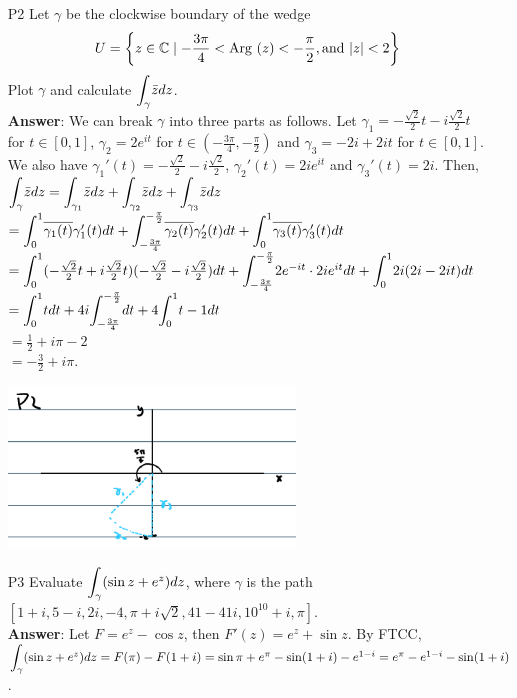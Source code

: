\documentclass{article}
\begin{document}
\begin{itemize}
    \item [P2] Let $\gamma$ be the clockwise boundary of the wedge \[U=\left\{z\in\mathbb{C}\mid-\frac{3\pi}{4}<\text{Arg }(z)<-\frac{\pi}{2},\text{and }\abs{z}<2\right\}\] Plot $\gamma$ and calculate $\mathlarger{\int_\gamma}\bar{z}dz$.\\
          \textbf{Answer}: We can break $\gamma$ into three parts as follows. Let $\gamma_1=-\frac{\sqrt{2}}{2}t-i\frac{\sqrt{2}}{2}t$ for $t\in[0,1]$, $\gamma_2=2e^{it}$ for $t\in(-\frac{3\pi}{4},-\frac{\pi}{2})$ and $\gamma_3=-2i+2it$ for $t\in[0,1]$. We also have $\gamma_1'(t)=-\frac{\sqrt{2}}{2}-i\frac{\sqrt{2}}{2}$, $\gamma_2'(t)=2ie^{it}$ and $\gamma_3'(t)=2i$. Then,\\
          $\mathlarger{\int_\gamma}\bar{z}dz=\mathlarger{\int_{\gamma_1}}\bar{z}dz+\mathlarger{\int_{\gamma_2}}\bar{z}dz+\mathlarger{\int_{\gamma_3}}\bar{z}dz$\\$=\mathlarger{\int_0^1}\overline{\gamma_1(t)}\gamma_1'(t)dt+\mathlarger{\int_{-\frac{3\pi}{4}}^{-\frac{\pi}{2}}}\overline{\gamma_2(t)}\gamma_2'(t)dt+\mathlarger{\int_0^1}\overline{\gamma_3(t)}\gamma_3'(t)dt$\\$=\mathlarger{\int_0^1}(-\frac{\sqrt{2}}{2}t+i\frac{\sqrt{2}}{2}t)(-\frac{\sqrt{2}}{2}-i\frac{\sqrt{2}}{2})dt+\mathlarger{\int_{-\frac{3\pi}{4}}^{-\frac{\pi}{2}}}2e^{-it}\cdot 2ie^{it}dt+\mathlarger{\int_0^1}2i(2i-2it)dt$\\$=\mathlarger{\int_0^1}tdt+4i\mathlarger{\int_{-\frac{3\pi}{4}}^{-\frac{\pi}{2}}}dt+4\mathlarger{\int_0^1}t-1dt$\\$=\frac{1}{2}+i\pi-2$\\$=-\frac{3}{2}+i\pi$.
          \begin{center}
              \includegraphics[width=3in]{p2.png}
          \end{center}
    \item [P3] Evaluate $\mathlarger{\int_\gamma}(\sin z+e^z)dz$, where $\gamma$ is the path $[1+i,5-i,2i,-4,\pi+i\sqrt{2},41-41i,10^{10}+i,\pi]$.\\
          \textbf{Answer}: Let $F=e^z-\cos z$, then $F'(z)=e^z+\sin z$. By FTCC, $\mathlarger{\int_\gamma}(\sin z+e^z)dz=F(\pi)-F(1+i)=\sin\pi+e^\pi-\sin(1+i)-e^{1-i}=e^\pi-e^{1-i}-\sin(1+i)$.
\end{itemize}
\end{document}
